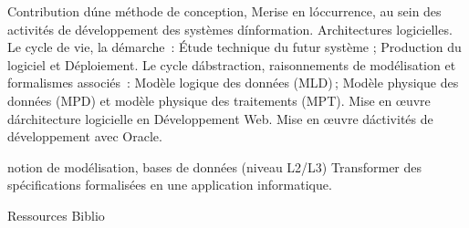 \vfill

{
Contribution d\'une méthode de conception, Merise en l\'occurrence, au sein des activités de développement des systèmes d\'information. Architectures logicielles. Le cycle de vie, la démarche \,: Étude technique du futur système ; Production du logiciel et Déploiement. Le cycle d\'abstraction, raisonnements de modélisation et formalismes associés \,: Modèle logique des données (MLD)\,; Modèle physique des données (MPD) et modèle physique des traitements (MPT). Mise en \oe uvre d\'architecture logicielle en Développement Web. Mise en \oe uvre d\'activités de développement avec Oracle. 
} 
{} 
{\begin{itemize} 
 \ObjItem notion de modélisation, bases de données (niveau L2/L3) 
 \ObjItem Transformer des spécifications formalisées en une application informatique. 
\end{itemize} 
} 
{Ressources} 
{Biblio} 
 
\vfill

